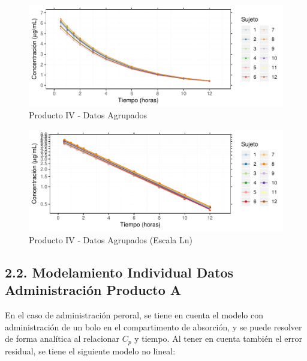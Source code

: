 \documentclass[]{article}
\begin{document}
\begin{figure}[H]

{\centering \includegraphics{parcial_1_files/figure-latex/unnamed-chunk-5-1} 

}

\caption{Producto IV - Datos Agrupados}\label{fig:unnamed-chunk-5}
\end{figure}

\begin{figure}[H]

{\centering \includegraphics{parcial_1_files/figure-latex/unnamed-chunk-6-1} 

}

\caption{Producto IV - Datos Agrupados (Escala Ln)}\label{fig:unnamed-chunk-6}
\end{figure}

\pagebreak
\pagebreak
\pagebreak
\pagebreak
\pagebreak
\pagebreak
\pagebreak
\pagebreak
\pagebreak
\pagebreak

\subsection{2.2. Modelamiento Individual Datos Administración Producto
A}\label{modelamiento-individual-datos-administracion-producto-a}

En el caso de administración peroral, se tiene en cuenta el modelo con
administración de un bolo en el compartimento de absorción, y se puede
resolver de forma analítica al relacionar \(C_{p}\) y tiempo. Al tener
en cuenta también el error residual, se tiene el siguiente modelo no
lineal:
\end{document}
